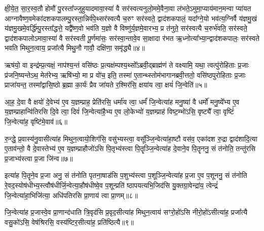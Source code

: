 क्षी॒ये॒त॒ सा॒र॒स्व॒तौ होमौ॑ पु॒रस्ता᳚ज्जुहुयादमावा॒स्या॑ वै सर॑स्वत्यनुलो॒ममे॒वैना॒वा ल॑भते॒\-ऽमुमा॒प्याय॑मान॒मन्वा प्या॑यत आग्नावैष्ण॒वमेका॑दशकपालम्पु॒रस्ता॒न्निर्व॑पे॒थ्सर॑स्वत्यै च॒रुꣳ सर॑स्वते॒ द्वाद॑शकपालं॒ यदा᳚ग्ने॒यो भव॑त्य॒ग्निर्वै य॑ज्ञमु॒खं य॑ज्ञमु॒खमे॒वर्द्धि॑म्पु॒रस्ता᳚द्धत्ते॒ यद्वै᳚ष्ण॒वो भव॑ति य॒ज्ञो वै विष्णु॑र्य॒ज्ञमे॒वारभ्य॒ प्र त॑नुते॒ सर॑स्वत्यै च॒रुर्भ॑वति॒ सर॑स्वते॒ द्वाद॑शकपालो\-ऽमावा॒स्या॑ वै सर॑स्वती पू॒र्णमा॑सः॒ सर॑स्वा॒न्तावे॒व सा॒क्षादा र॑भत ऋ॒ध्नोत्या᳚भ्या॒न्द्वाद॑शकपालः॒ सर॑स्वते भवति मिथुन॒त्वाय॒ प्रजा᳚त्यै मिथु॒नौ गावौ॒ दक्षि॑णा॒ समृ॑द्ध्यै॥४॥

{}

ऋष॑यो॒ वा इन्द्र॑म्प्र॒त्यक्षं॒ नाप॑श्य॒न्तं वसि॑ष्ठः प्र॒त्यक्ष॑म्पश्य॒थ्सो᳚\-ऽब्रवी॒द्ब्राह्म॑णं ते वक्ष्यामि॒ यथा॒ त्वत्पु॑रोहिताः प्र॒जाः प्र॑जनि॒ष्यन्ते\-ऽथ॒ मेत॑रेभ्य॒ ऋषि॑भ्यो॒ मा प्र वो॑च॒ इति॒ तस्मा॑ ए॒तान्थ्स्तोम॑भागानब्रवी॒त्ततो॒ वसि॑ष्ठपुरोहिताः प्र॒जाः प्राजा॑यन्त॒ तस्मा᳚द्वासि॒ष्ठो ब्र॒ह्मा का॒र्यः॑ प्रैव जा॑यते र॒श्मिर॑सि॒ क्षया॑य त्वा॒ क्षयं॑ जि॒न्वेति॑॥५॥

आ॒ह॒ दे॒वा वै क्षयो॑ दे॒वेभ्य॑ ए॒व य॒ज्ञम्प्राह॒ प्रेति॑रसि॒ धर्मा॑य त्वा॒ धर्मं॑ जि॒न्वेत्या॑ह मनु॒ष्या॑ वै धर्मो॑ मनु॒ष्ये᳚भ्य ए॒व य॒ज्ञम्प्राहान्वि॑तिरसि दि॒वे त्वा॒ दिवं॑ जि॒न्वेत्या॑है॒भ्य ए॒व लो॒केभ्यो॑ य॒ज्ञम्प्राह॑ विष्ट॒म्भो॑\-ऽसि॒ वृष्ट्यै᳚ त्वा॒ वृष्टिं॑ जि॒न्वेत्या॑ह॒ वृष्टि॑मे॒वाव॑॥६॥

रु॒न्द्धे॒ प्र॒वास्य॑नु॒वासीत्या॑ह मिथुन॒त्वायो॒शिग॑सि॒ वसु॑भ्यस्त्वा॒ वसू᳚ञ्जि॒न्वेत्या॑हा॒ष्टौ वस॑व॒ एका॑दश रु॒द्रा द्वाद॑शादि॒त्या ए॒ताव॑न्तो॒ वै दे॒वास्तेभ्य॑ ए॒व य॒ज्ञम्प्राहौजो॑\-ऽसि पि॒तृभ्य॑स्त्वा पि॒तॄञ्जि॒न्वेत्या॑ह दे॒वाने॒व पि॒तॄननु॒ सं त॑नोति॒ तन्तु॑रसि प्र॒जाभ्य॑स्त्वा प्र॒जा जि॑न्व॥७॥

इत्या॑ह पि॒तॄने॒व प्र॒जा अनु॒ सं त॑नोति पृतना॒षाड॑सि प॒शुभ्य॑स्त्वा प॒शूञ्जि॒न्वेत्या॑ह प्र॒जा ए॒व प॒शूननु॒ सं त॑नोति रे॒वद॒स्योष॑धीभ्य॒स्त्वौष॑धीर्जि॒न्वेत्या॒हौष॑धीष्वे॒व प॒शून्प्रति॑ ष्ठापयत्यभि॒जिद॑सि यु॒क्तग्रा॒वेन्द्रा॑य॒ त्वेन्द्रं॑ जि॒न्वेत्या॑हा॒भिजि॑त्या॒ अधि॑पतिरसि प्रा॒णाय॑ त्वा प्रा॒णम्॥८॥

जि॒न्वेत्या॑ह प्र॒जास्वे॒व प्रा॒णान्द॑धाति त्रि॒वृद॑सि प्र॒वृद॒सीत्या॑ह मिथुन॒त्वाय॑ सꣳरो॒हो॑\-ऽसि नीरो॒हो॑\-ऽसीत्या॑ह॒ प्रजा᳚त्यै वसु॒को॑\-ऽसि॒ वेष॑श्रिरसि॒ वस्य॑ष्टिर॒सीत्या॑ह॒ प्रति॑ष्ठित्यै॥९॥

{\anuvakamend[{जि॒न्वेत्यव॑ प्र॒जा जि॑न्व प्रा॒णन्त्रि॒ꣳ॒शच्च॑॥२॥}]}

